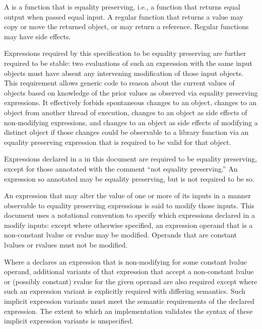 \begin{addedblock}
\pnum
A  is a function that is equality preserving,
i.e., a function that returns equal output when passed equal input. A regular
function that returns a value may copy or move the returned object, or may return a
reference. \enternote Regular functions may have side effects. \exitnote

\pnum
Expressions required by this specification to be equality preserving are
further required to be stable: two evaluations of such an expression with the same
input objects must have  absent any
 intervening modification of those input objects.
\enternote This requirement allows generic code to reason
about the current values of objects based on knowledge of the prior values as
observed via equality preserving expressions. It effectively forbids spontaneous
changes to an object, changes to an object from another thread of execution, changes
to an object as side effects of non-modifying expressions, and changes to an object as
side effects of modifying a distinct object if those changes could be observable
to a library function via an equality preserving expression that is required to be
valid for that object. \exitnote

\pnum
Expressions declared in a  in this document are
required to be equality preserving, except for those annotated with the comment
``not  equality preserving.'' An expression so annotated
may be equality preserving, but is not required to be so.

\pnum
An expression that may alter the value of one or more of its inputs in a manner
observable to equality preserving expressions is said to modify those inputs.
This document uses a notational convention to specify which expressions declared
in a  modify  inputs: except where otherwise
specified, an expression operand that is a non-constant lvalue or rvalue may be
modified. Operands that are constant lvalues or rvalues must not be modified.

\pnum
Where a  declares an expression that is non-modifying
for some constant lvalue operand, additional variants of that expression that accept
a non-constant lvalue or (possibly constant) rvalue for the given operand are also
required except where such an expression variant is explicitly required with
differing semantics. Such implicit expression variants must meet the semantic
requirements of the declared expression. The extent to which an implementation
validates the syntax of these implicit expression variants is unspecified.


\end{addedblock}
